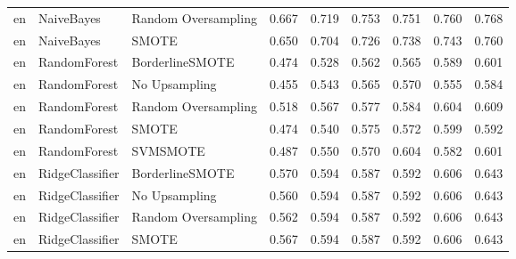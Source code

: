 \begin{tabular}{lllllllll}
      en &                   NaiveBayes & Random Oversampling & 0.667 &                     0.719 &                 0.753 &                  0.751 &                                   0.760 &     0.768 \\
      en &                   NaiveBayes &               SMOTE & 0.650 &                     0.704 &                 0.726 &                  0.738 &                                   0.743 &     0.760 \\
      en &                 RandomForest &     BorderlineSMOTE & 0.474 &                     0.528 &                 0.562 &                  0.565 &                                   0.589 &     0.601 \\
      en &                 RandomForest &       No Upsampling & 0.455 &                     0.543 &                 0.565 &                  0.570 &                                   0.555 &     0.584 \\
      en &                 RandomForest & Random Oversampling & 0.518 &                     0.567 &                 0.577 &                  0.584 &                                   0.604 &     0.609 \\
      en &                 RandomForest &               SMOTE & 0.474 &                     0.540 &                 0.575 &                  0.572 &                                   0.599 &     0.592 \\
      en &                 RandomForest &            SVMSMOTE & 0.487 &                     0.550 &                 0.570 &                  0.604 &                                   0.582 &     0.601 \\
      en &              RidgeClassifier &     BorderlineSMOTE & 0.570 &                     0.594 &                 0.587 &                  0.592 &                                   0.606 &     0.643 \\
      en &              RidgeClassifier &       No Upsampling & 0.560 &                     0.594 &                 0.587 &                  0.592 &                                   0.606 &     0.643 \\
      en &              RidgeClassifier & Random Oversampling & 0.562 &                     0.594 &                 0.587 &                  0.592 &                                   0.606 &     0.643 \\
      en &              RidgeClassifier &               SMOTE & 0.567 &                     0.594 &                 0.587 &                  0.592 &                                   0.606 &     0.643 \\

\end{tabular}

